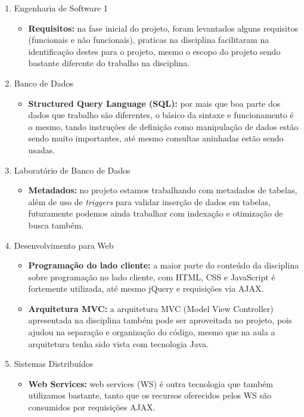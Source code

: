 \documentclass{ufscar}
\begin{document}
\begin{enumerate}
  \item Engenharia de Software 1
  \begin{itemize}
    \item \textbf{Requisitos:} na fase inicial do projeto, foram levantados alguns requisitos (funcionais e não funcionais), praticas na disciplina facilitaram na identificação destes para o projeto, mesmo o escopo do projeto sendo bastante diferente do trabalho na disciplina.
  \end{itemize}

  \item Banco de Dados
  \begin{itemize}
    \item \textbf{Structured Query Language (SQL):} por mais que boa parte dos dados que trabalho são diferentes, o básico da sintaxe e funcionamento é o mesmo, tando instruções de definição como manipulação de dados estão sendo muito importantes, até mesmo consultas aninhadas estão sendo usadas.
  \end{itemize}

  \item Laboratório de Banco de Dados
  \begin{itemize}
    \item \textbf{Metadados:} no projeto estamos trabalhando com metadados de tabelas, além de uso de \textit{triggers} para validar inserção de dados em tabelas, futuramente podemos ainda trabalhar com indexação e otimização de busca também.
  \end{itemize}

  \item Desenvolvimento para Web
  \begin{itemize}
    \item \textbf{Programação do lado cliente:} a maior parte do conteúdo da disciplina sobre programação no lado cliente, com HTML, CSS e JavaScript é fortemente utilizada, até mesmo jQuery e requisições via AJAX.
    \item \textbf{Arquitetura MVC:} a arquitetura MVC (Model View Controller) apresentada na disciplina também pode ser aproveitada no projeto, pois ajudou na separação e organização do código, mesmo que na aula a arquitetura tenha sido vista com tecnologia Java.
  \end{itemize}

  \item Sistemas Distribuídos
  \begin{itemize}
    \item \textbf{Web Services:} web services (WS) é outra tecnologia que também utilizamos bastante, tanto que os recursos oferecidos pelos WS são consumidos por requisições AJAX.
  \end{itemize}


\end{enumerate}
\end{document}
